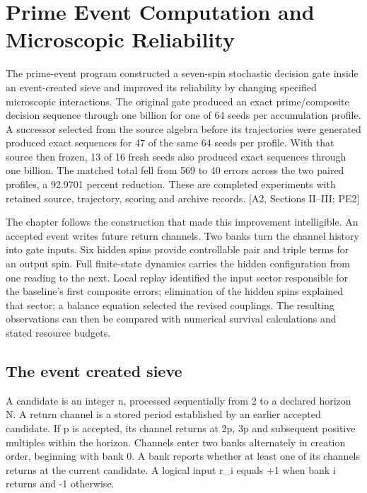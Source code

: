 \chapter{Prime Event Computation and Microscopic Reliability}\label{prime-event-computation-and-microscopic-reliability}

The prime-event program constructed a seven-spin stochastic decision gate inside an event-created sieve and improved its reliability by changing specified microscopic interactions. The original gate produced an exact prime/composite decision sequence through one billion for one of 64 seeds per accumulation profile. A successor selected from the source algebra before its trajectories were generated produced exact sequences for 47 of the same 64 seeds per profile. With that source then frozen, 13 of 16 fresh seeds also produced exact sequences through one billion. The matched total fell from 569 to 40 errors across the two paired profiles, a 92.9701 percent reduction. These are completed experiments with retained source, trajectory, scoring and archive records. {[}A2, Sections II--III; PE2{]}

The chapter follows the construction that made this improvement intelligible. An accepted event writes future return channels. Two banks turn the channel history into gate inputs. Six hidden spins provide controllable pair and triple terms for an output spin. Full finite-state dynamics carries the hidden configuration from one reading to the next. Local replay identified the input sector responsible for the baseline's first composite errors; elimination of the hidden spins explained that sector; a balance equation selected the revised couplings. The resulting observations can then be compared with numerical survival calculations and stated resource budgets.

\section{The event created sieve}\label{the-event-created-sieve}

A candidate is an integer n, processed sequentially from 2 to a declared horizon N. A return channel is a stored period established by an earlier accepted candidate. If p is accepted, its channel returns at 2p, 3p and subsequent positive multiples within the horizon. Channels enter two banks alternately in creation order, beginning with bank 0. A bank reports whether at least one of its channels returns at the current candidate. A logical input r\_i equals +1 when bank i returns and -1 otherwise.

